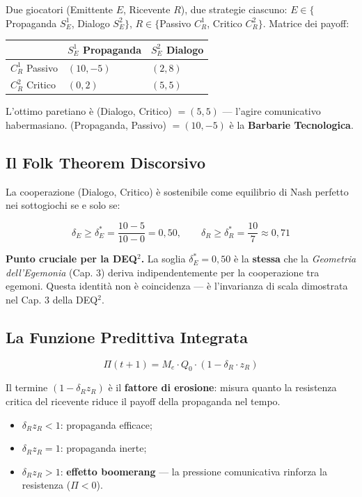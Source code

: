 Due giocatori (Emittente \(E\), Ricevente \(R\)), due strategie
ciascuno: \(E \in \{\)Propaganda \(S^1_E\), Dialogo \(S^2_E\}\),
\(R \in \{\)Passivo \(C^1_R\), Critico \(C^2_R\}\). Matrice dei payoff:

{\def\LTcaptype{none} %
{\small\begin{longtable}[]{@{}lll@{}}
\toprule\noalign{}
& \(S^1_E\) Propaganda & \(S^2_E\) Dialogo \\
\midrule\noalign{}
\endhead
\bottomrule\noalign{}
\endlastfoot
\(C^1_R\) Passivo & \((10, -5)\) & \((2, 8)\) \\
\(C^2_R\) Critico & \((0, 2)\) & \((5, 5)\) \\
\end{longtable}}
}

L'ottimo paretiano è (Dialogo, Critico) \(= (5, 5)\) --- l'agire
comunicativo habermasiano. (Propaganda, Passivo) \(= (10, -5)\) è la
\textbf{Barbarie Tecnologica}.

\subsection{Il Folk Theorem
Discorsivo}\label{il-folk-theorem-discorsivo}

\Proved{} La cooperazione (Dialogo, Critico) è sostenibile come
equilibrio di Nash perfetto nei sottogiochi se e solo se:

\[
\delta_E \geq \delta^*_E = \frac{10 - 5}{10 - 0} = 0{,}50, \qquad \delta_R \geq \delta^*_R = \frac{10}{7} \approx 0{,}71
\]

\Hypoth{} \textbf{Punto cruciale per la DEQ$^2$.} La soglia
\(\delta^*_E = 0{,}50\) è la \textbf{stessa} che la \emph{Geometria
dell'Egemonia} (Cap. 3) deriva indipendentemente per la cooperazione tra
egemoni. Questa identità non è coincidenza --- è l'invarianza di scala
dimostrata nel Cap. 3 della DEQ$^2$.

\subsection{La Funzione Predittiva
Integrata}\label{la-funzione-predittiva-integrata}

\[
\boxed{\Pi(t+1) = M_e \cdot Q_0 \cdot (1 - \delta_R \cdot z_R)}
\]

Il termine \((1 - \delta_R z_R)\) è il \textbf{fattore di erosione}:
misura quanto la resistenza critica del ricevente riduce il payoff della
propaganda nel tempo.

\begin{itemize}
\tightlist
\item
  \(\delta_R z_R < 1\): propaganda efficace;
\item
  \(\delta_R z_R = 1\): propaganda inerte;
\item
  \(\delta_R z_R > 1\): \textbf{effetto boomerang} --- la pressione
  comunicativa rinforza la resistenza (\(\Pi < 0\)).
\end{itemize}

